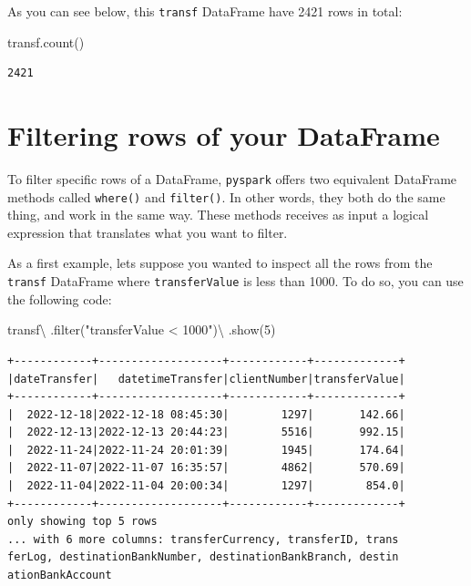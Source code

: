 \documentclass[
  11pt,
  letterpaper,
  DIV=11,
  numbers=noendperiod]{scrreprt}
\newenvironment{Shaded}{\begin{snugshade}}{\end{snugshade}}
\newcommand{\BuiltInTok}[1]{\textcolor[rgb]{0.00,0.23,0.31}{#1}}
\newcommand{\DecValTok}[1]{\textcolor[rgb]{0.68,0.00,0.00}{#1}}
\newcommand{\NormalTok}[1]{\textcolor[rgb]{0.00,0.23,0.31}{#1}}
\newcommand{\OperatorTok}[1]{\textcolor[rgb]{0.37,0.37,0.37}{#1}}
\newcommand{\StringTok}[1]{\textcolor[rgb]{0.13,0.47,0.30}{#1}}
\begin{document}
As you can see below, this \texttt{transf} DataFrame have 2421 rows in
total:

\begin{Shaded}
\begin{Highlighting}[]
\NormalTok{transf.count()}
\end{Highlighting}
\end{Shaded}

\begin{verbatim}
2421
\end{verbatim}

\section{Filtering rows of your
DataFrame}\label{filtering-rows-of-your-dataframe}

To filter specific rows of a DataFrame, \texttt{pyspark} offers two
equivalent DataFrame methods called \texttt{where()} and
\texttt{filter()}. In other words, they both do the same thing, and work
in the same way. These methods receives as input a logical expression
that translates what you want to filter.

As a first example, lets suppose you wanted to inspect all the rows from
the \texttt{transf} DataFrame where \texttt{transferValue} is less than
1000. To do so, you can use the following code:

\begin{Shaded}
\begin{Highlighting}[]
\NormalTok{transf}\OperatorTok{\textbackslash{}}
\NormalTok{  .}\BuiltInTok{filter}\NormalTok{(}\StringTok{"transferValue \textless{} 1000"}\NormalTok{)}\OperatorTok{\textbackslash{}}
\NormalTok{  .show(}\DecValTok{5}\NormalTok{)}
\end{Highlighting}
\end{Shaded}

\begin{verbatim}
+------------+-------------------+------------+-------------+
|dateTransfer|   datetimeTransfer|clientNumber|transferValue|
+------------+-------------------+------------+-------------+
|  2022-12-18|2022-12-18 08:45:30|        1297|       142.66|
|  2022-12-13|2022-12-13 20:44:23|        5516|       992.15|
|  2022-11-24|2022-11-24 20:01:39|        1945|       174.64|
|  2022-11-07|2022-11-07 16:35:57|        4862|       570.69|
|  2022-11-04|2022-11-04 20:00:34|        1297|        854.0|
+------------+-------------------+------------+-------------+
only showing top 5 rows
... with 6 more columns: transferCurrency, transferID, trans
ferLog, destinationBankNumber, destinationBankBranch, destin
ationBankAccount
\end{verbatim}
\end{document}
